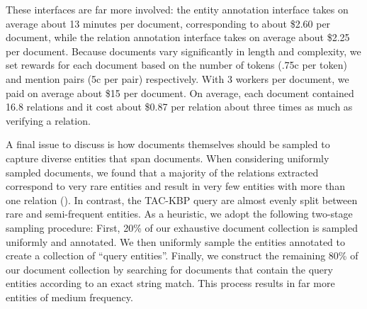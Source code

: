 These interfaces are far more involved: the entity annotation interface takes on average about 13 minutes per document, corresponding to about \$2.60 per document, while the relation annotation interface takes on average about \$2.25 per document.
Because documents vary significantly in length and complexity, we set rewards for each document based on the number of tokens (.75c per token) and mention pairs (5c per pair) respectively.
With 3 workers per document, we paid on average about \$15 per document.
On average, each document contained 16.8 relations and it cost about \$0.87 per relation about three times as much as verifying a relation.

A final issue to discuss is how documents themselves should be sampled to capture diverse entities that span documents.
When considering uniformly sampled documents, we found that a majority of the relations extracted correspond to very rare entities and result in very few entities with more than one relation ().
In contrast, the TAC-KBP query are almost evenly split between rare and semi-frequent entities.
As a heuristic, we adopt the following two-stage sampling procedure:
First, 20\% of our exhaustive document collection is sampled uniformly and annotated.
We then uniformly sample the entities annotated to create a collection of ``query entities''.
Finally, we construct the remaining 80\% of our document collection by searching for documents that contain the query entities according to an exact string match. This process results in far more entities of medium frequency.
